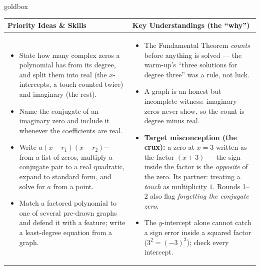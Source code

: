 \documentclass[10pt]{article}
\begin{document}
\renewcommand{\arraystretch}{1.4}
\begin{skillbox}{goldbox}
\begin{tabularx}{\linewidth}{@{}X|X@{}}
\textbf{Priority Ideas \& Skills} & \textbf{Key Understandings (the ``why'')} \\[2pt]
\hline
\vspace{-6pt}
\begin{itemize}[leftmargin=1.1em, nosep, after=\vspace{2pt}]
  \item State how many complex zeros a polynomial has from its degree, and split them into
        real (the $x$-intercepts, a touch counted twice) and imaginary (the rest).
  \item Name the conjugate of an imaginary zero and include it whenever the coefficients are
        real.
  \item Write $a(x-r_1)(x-r_2)\cdots$ from a list of zeros, multiply a conjugate pair to a real
        quadratic, expand to standard form, and solve for $a$ from a point.
  \item Match a factored polynomial to one of several pre-drawn graphs and defend it with a
        feature; write a least-degree equation from a graph.
\end{itemize}
&
\vspace{-6pt}
\begin{itemize}[leftmargin=1.1em, nosep, after=\vspace{2pt}]
  \item The Fundamental Theorem \emph{counts} before anything is solved --- the warm-up's
        ``three solutions for degree three'' was a rule, not luck.
  \item A graph is an honest but incomplete witness: imaginary zeros never show, so the count
        is degree minus real.
  \item \textbf{Target misconception (the crux):} a zero at $x=3$ written as the factor
        $(x+3)$ --- the sign inside the factor is the \emph{opposite} of the zero. Its partner:
        treating a \emph{touch} as multiplicity $1$. Rounds 1--2 also flag \emph{forgetting
        the conjugate zero}.
  \item The $y$-intercept alone cannot catch a sign error inside a squared factor
        ($3^2=(-3)^2$); check every intercept.
\end{itemize}
\end{tabularx}
\end{skillbox}
\end{document}

